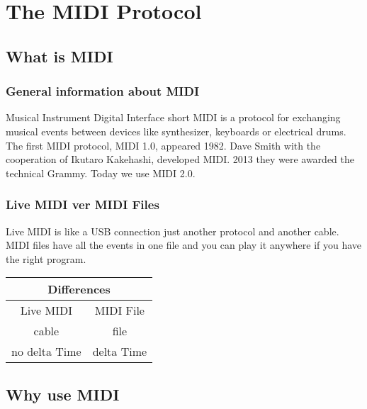 \setchapterpreamble[u]{\margintoc}

\setcounter{chapter}{19}

\chapter{The MIDI Protocol}

\section{What is MIDI}

\subsection{General information about MIDI}

Musical Instrument Digital Interface short MIDI is a protocol for exchanging musical events between devices like synthesizer, keyboards or electrical drums. The first MIDI protocol, MIDI 1.0, appeared 1982. Dave Smith with the cooperation of Ikutaro Kakehashi, developed MIDI. 2013 they were awarded the technical Grammy. Today we use MIDI 2.0.

\subsection{Live MIDI ver MIDI Files}

Live MIDI is like a USB connection just another protocol and another cable. MIDI files have all the events in one file and you can play it anywhere if you have the right program.

\begin{center}
\begin{tabular}{@{}cc@{}}
\toprule
\multicolumn{2}{c}{Differences}             \\\midrule
Live MIDI            & MIDI File            \\
cable                & file                 \\
no delta Time        & delta Time           \\\bottomrule
\end{tabular}
\end{center}
\phantom{Hello}

\section{Why use MIDI}

